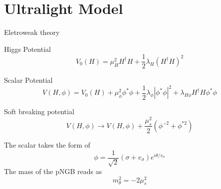 \section{Ultralight Model}
\frame{\sectionpage}

\begin{frame}{Eletroweak theory}
\begin{block}{Higgs Potential}
\begin{equation}
    V_0(H)=\mu_{H}^{2}H^{\dag}H+\frac{1}{2}\lambda_H(H^{\dag}H)^2
\end{equation}
\end{block}
\begin{block}{Scalar Potential
\cite{Freitas_2021}}
\begin{equation}
    V(H,\phi)=V_0(H)+\mu_\phi^2\phi^*\phi+\frac{1}{2}\lambda_\phi|\phi^*\phi|^2+\lambda_{H\phi}H^{\dag}H\phi^*\phi
\end{equation}
\end{block}

\end{frame}
\begin{frame}
    \pause
    \begin{block}{Soft breaking potential}
    \begin{equation}
        V(H,\phi)\rightarrow V(H,\phi)+\dfrac{\mu_s^2}{2}\left(\phi´^2+\phi^{*2}\right)
    \end{equation}
    \end{block}
    \pause
    The scalar takes the form of
    \bigskip
    \begin{equation}
        \phi=\dfrac{1}{\sqrt{2}}(\sigma+v_\sigma)e^{i\theta/v_\sigma}
    \end{equation}
    \pause
    The mass of the pNGB reads as
    \begin{equation}
	m^2_\theta=-2\mu_s^2
    \end{equation}
\end{frame}
